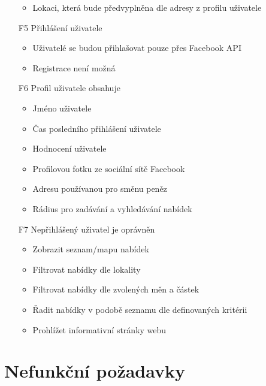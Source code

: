 \begin{itemize}
\begin{itemize}
            \item Lokaci, která bude předvyplněna dle adresy z profilu uživatele
        \end{itemize}
    \item[F5] Přihlášení uživatele
        \begin{itemize}
            \item Uživatelé se budou přihlašovat pouze přes Facebook API
            \item Registrace není možná
        \end{itemize}
    \item[F6] Profil uživatele obsahuje
        \begin{itemize}
            \item Jméno uživatele
            \item Čas posledního přihlášení uživatele
            \item Hodnocení uživatele
            \item Profilovou fotku ze sociální sítě Facebook
            \item Adresu používanou pro směnu peněz
            \item Rádius pro zadávání a vyhledávání nabídek
        \end{itemize}
    \item[F7] Nepřihlášený uživatel je oprávněn
        \begin{itemize}
            \item Zobrazit seznam/mapu nabídek
            \item Filtrovat nabídky dle lokality
            \item Filtrovat nabídky dle zvolených měn a částek
            \item Řadit nabídky v podobě seznamu dle definovaných kritérii
            \item Prohlížet informativní stránky webu
        \end{itemize}
\end{itemize}


\section{Nefunkční požadavky}


